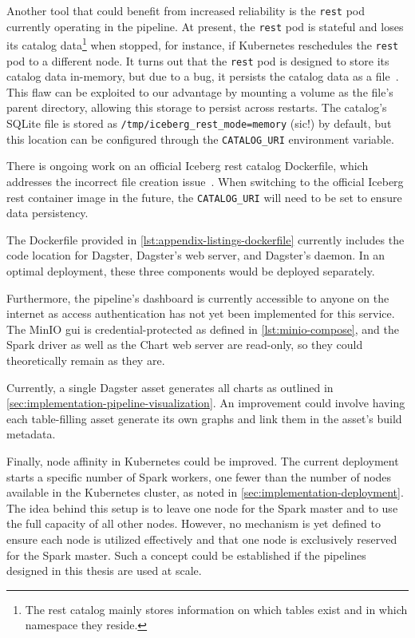 Another tool that could benefit from increased reliability is the \texttt{rest} pod currently operating in the pipeline.
At present, the \texttt{rest} pod is stateful and loses its catalog data\footnote{The \ac{rest} catalog mainly stores information on which tables exist and in which namespace they reside.} when stopped, for instance, if Kubernetes reschedules the \texttt{rest} pod to a different node.
It turns out that the \texttt{rest} pod is designed to store its catalog data in-memory, but due to a bug, it persists the catalog data as a file~\cite{Kolter2023}.
This flaw can be exploited to our advantage by mounting a volume as the file's parent directory, allowing this storage to persist across restarts.
The catalog's SQLite file is stored as \texttt{/tmp/iceberg\_rest\_mode=memory} (sic!) by default, but this location can be configured through the \texttt{CATALOG\_URI} environment variable.

There is ongoing work on an official Iceberg \ac{rest} catalog Dockerfile, which addresses the incorrect file creation issue~\cite{Bhat2024}.
When switching to the official Iceberg \ac{rest} container image in the future, the \texttt{CATALOG\_URI} will need to be set to ensure data persistency.

The Dockerfile provided in \cref{lst:appendix-listings-dockerfile} currently includes the code location for Dagster, Dagster's web server, and Dagster's daemon.
In an optimal deployment, these three components would be deployed separately.

Furthermore, the pipeline's dashboard is currently accessible to anyone on the internet as access authentication has not yet been implemented for this service.
The MinIO \ac{gui} is credential-protected as defined in \cref{lst:minio-compose}, and the Spark driver as well as the Chart web server are read-only, so they could theoretically remain as they are.

Currently, a single Dagster asset generates all charts as outlined in \cref{sec:implementation-pipeline-visualization}.
An improvement could involve having each table-filling asset generate its own graphs and link them in the asset's build metadata.

Finally, node affinity in Kubernetes could be improved.
The current deployment starts a specific number of Spark workers, one fewer than the number of nodes available in the Kubernetes cluster, as noted in \cref{sec:implementation-deployment}.
The idea behind this setup is to leave one node for the Spark master and to use the full capacity of all other nodes.
However, no mechanism is yet defined to ensure each node is utilized effectively and that one node is exclusively reserved for the Spark master.
Such a concept could be established if the pipelines designed in this thesis are used at scale.


